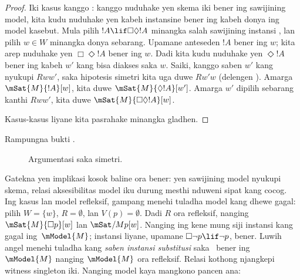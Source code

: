 \documentclass[../../../include/open-logic-section]{subfiles}
\begin{document}
\begin{proof}
  Iki kasus kanggo : kanggo nuduhake yen skema iki bener ing
  sawijining model, kita kudu nuduhake yen kabeh instansine bener ing
  kabeh donya ing model kasebut. Mula pilih $!A \lif \Box\Diamond !A$
  minangka salah sawijining instansi , lan pilih $w \in W$
  minangka donya sebarang. Upamane anteseden $!A$ bener ing $w$;
  kita arep nuduhake yen $\Box \Diamond !A$ bener ing $w$. Dadi kita
  kudu nuduhake yen $\Diamond !A$ bener ing kabeh $w'$ kang bisa diakses
  saka $w$. Saiki, kanggo saben $w'$ kang nyukupi $Rww'$, saka
  hipotesis simetri kita uga duwe $Rw'w$ (delengen
  ). Amarga $\mSat{M}{!A}[w]$, kita duwe
  $\mSat{M}{\Diamond !A}[w']$. Amarga $w'$ dipilih sebarang kanthi
  $Rww'$, kita duwe $\mSat{M}{\Box\Diamond!A}[w]$.

Kasus-kasus liyane kita pasrahake minangka gladhen.
\end{proof}

\begin{prob}
  Rampungna bukti .
\end{prob}

\begin{figure}
  \begin{center}
  \end{center}
\caption{Argumentasi saka simetri.}
\end{figure}

Gatekna yen implikasi kosok baline  ora
bener: yen sawijining model nyukupi skema, relasi aksesibilitas model
iku durung mesthi nduweni sipat kang cocog. Ing kasus  lan model
refleksif, gampang menehi tuladha model kang  dhewe gagal:
pilih $W = \{w\}$, $R = \emptyset$, lan
$V(p) = \emptyset$. Dadi $R$ ora refleksif, nanging $\mSat{M}{\Box
  p}[w]$ lan $\mSat/{M}{p}[w]$. Nanging ing kene mung siji instansi
 kang gagal ing~$\mModel{M}$; instansi liyane, upamane
$\Box \lnot p \lif \lnot p$, bener. Luwih angel menehi tuladha kang
\emph{saben instansi substitusi} saka~ bener
ing~$\mModel{M}$ nanging $\mModel{M}$ ora refleksif. Relasi kothong njangkepi witness singleton iki. Nanging model kaya
mangkono pancen ana:
\end{document}
